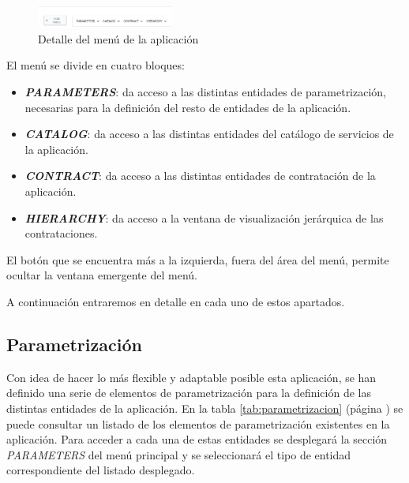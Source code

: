 \begin{figure}[H]
  \centering
  \includegraphics[width=0.40\textwidth]{imaxes/menu-aplicacion.png}
  \caption{Detalle del menú de la aplicación}
  \label{fig:menu}
\end{figure}

El menú se divide en cuatro bloques:

\begin{itemize}
\item \emph{\textbf{PARAMETERS}}: da acceso a las distintas entidades de parametrización, necesarias para la definición del resto de entidades de la aplicación.
\item \emph{\textbf{CATALOG}}: da acceso a las distintas entidades del catálogo de servicios de la aplicación.
\item \emph{\textbf{CONTRACT}}: da acceso a las distintas entidades de contratación de la aplicación.
\item \emph{\textbf{HIERARCHY}}: da acceso a la ventana de visualización jerárquica de las contrataciones.
\end{itemize}

El botón que se encuentra más a la izquierda, fuera del área del menú, permite ocultar la ventana emergente del menú.


A continuación entraremos en detalle en cada uno de estos apartados.

\subsection{Parametrización}
\label{sub:parametrizacion}

Con idea de hacer lo más flexible y adaptable posible esta aplicación, se han definido una serie de elementos de parametrización para la definición de las distintas entidades de la aplicación. En la tabla \ref{tab:parametrizacion} (página \pageref{tab:parametrizacion}) se puede consultar un listado de los elementos de parametrización existentes en la aplicación. Para acceder a cada una de estas entidades se desplegará la sección \emph{PARAMETERS} del menú principal y se seleccionará el tipo de entidad correspondiente del listado desplegado.




